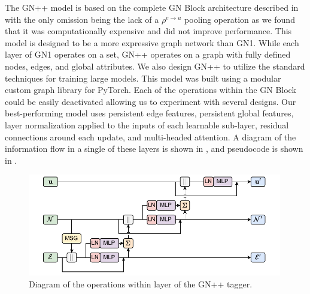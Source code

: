 The GN++ model is based on the complete GN Block architecture described in  with the only omission being the lack of a $\rho^{e \to u}$ pooling operation as we found that it was computationally expensive and did not improve performance.
This model is designed to be a more expressive graph network than GN1.
While each layer of GN1 operates on a set, GN++ operates on a graph with fully defined nodes, edges, and global attributes.
We also design GN++ to utilize the standard techniques for training large models.
This model was built using a modular custom graph library for PyTorch.
Each of the operations within the GN Block could be easily deactivated allowing us to experiment with several designs.
Our best-performing model uses persistent edge features, persistent global features, layer normalization applied to the inputs of each learnable sub-layer, residual connections around each update, and multi-headed attention.
A diagram of the information flow in a single of these layers is shown in , and pseudocode is shown in .

\begin{figure}[h!]
    \centering
    \includegraphics[width=0.99\textwidth]{figures/flavour_tagging/gnpp.pdf}
    \caption{Diagram of the operations within layer of the GN++ tagger.}
    \label{fig:gnpp_graph}
\end{figure}

